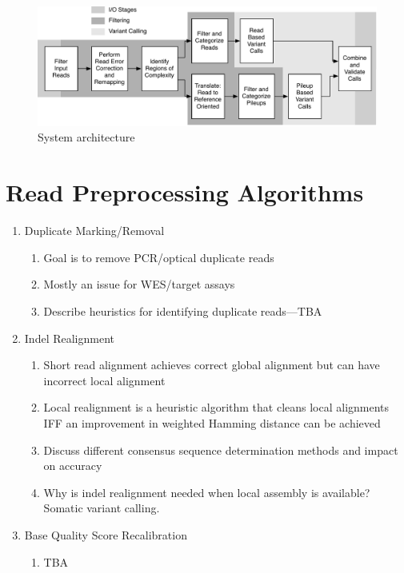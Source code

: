 \documentclass[11pt]{article}
\begin{document}
\begin{figure}[h]
\begin{center}
\includegraphics[width=0.9\linewidth]{avocado-architecture.pdf}
\end{center}
\caption{System architecture}
\label{fig:architecture}
\end{figure}

\section{Read Preprocessing Algorithms}
\label{sec:preprocessing}

\begin{enumerate}
\item Duplicate Marking/Removal
\begin{enumerate}
\item Goal is to remove PCR/optical duplicate reads
\item Mostly an issue for WES/target assays
\item Describe heuristics for identifying duplicate reads---TBA
\end{enumerate}
\item Indel Realignment
\begin{enumerate}
\item Short read alignment achieves correct global alignment but can have incorrect local alignment
\item Local realignment is a heuristic algorithm that cleans local alignments IFF an improvement in weighted Hamming distance can be achieved
\item Discuss different consensus sequence determination methods and impact on accuracy
\item Why is indel realignment needed when local assembly is available? Somatic variant calling.
\end{enumerate}
\item Base Quality Score Recalibration
\begin{enumerate}
\item TBA
\end{enumerate}
\end{enumerate}
\end{document}
